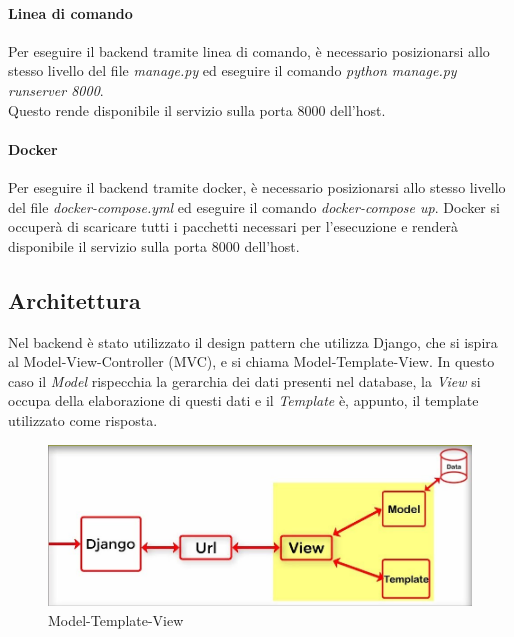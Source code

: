 \paragraph{Linea di comando}
Per eseguire il backend tramite linea di comando, è necessario posizionarsi allo stesso livello del file \textit{manage.py} ed eseguire il comando \textit{python manage.py runserver 8000}.\\Questo rende disponibile il servizio sulla porta 8000 dell'host.
\paragraph{Docker}
Per eseguire il backend tramite docker, è necessario posizionarsi allo stesso livello del file \textit{docker-compose.yml} ed eseguire il comando \textit{docker-compose up}. Docker si occuperà di scaricare tutti i pacchetti necessari per l'esecuzione e renderà disponibile il servizio sulla porta 8000 dell'host.
\subsection{Architettura}
Nel backend è stato utilizzato il design pattern che utilizza Django, che si ispira al Model-View-Controller (MVC), e si chiama Model-Template-View.
In questo caso il \textit{Model} rispecchia la gerarchia dei dati presenti nel database, la \textit{View} si occupa della elaborazione di questi dati e il \textit{Template} è, appunto, il template utilizzato come risposta.
\begin{figure}[H]
	\centering
	\includegraphics[width=16cm]{res/images/mvt.png}
	\caption{Model-Template-View}
	\label{fig:Model-Template-View}
\end{figure}
